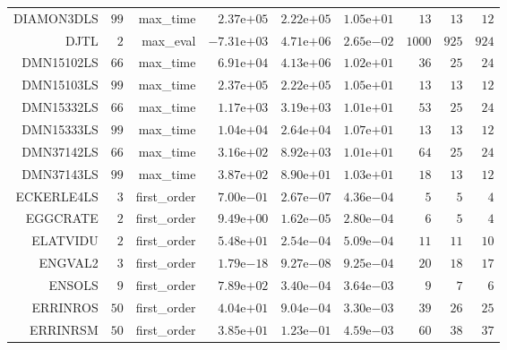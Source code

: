 \begin{longtable}{rrrrrrrrr}
DIAMON3DLS & \(    99\) & max\_time & \( 2.37\)e\(+05\) & \( 2.22\)e\(+05\) & \( 1.05\)e\(+01\) & \(    13\) & \(    13\) & \(    12\) \\
DJTL & \(     2\) & max\_eval & \(-7.31\)e\(+03\) & \( 4.71\)e\(+06\) & \( 2.65\)e\(-02\) & \(  1000\) & \(   925\) & \(   924\) \\
DMN15102LS & \(    66\) & max\_time & \( 6.91\)e\(+04\) & \( 4.13\)e\(+06\) & \( 1.02\)e\(+01\) & \(    36\) & \(    25\) & \(    24\) \\
DMN15103LS & \(    99\) & max\_time & \( 2.37\)e\(+05\) & \( 2.22\)e\(+05\) & \( 1.05\)e\(+01\) & \(    13\) & \(    13\) & \(    12\) \\
DMN15332LS & \(    66\) & max\_time & \( 1.17\)e\(+03\) & \( 3.19\)e\(+03\) & \( 1.01\)e\(+01\) & \(    53\) & \(    25\) & \(    24\) \\
DMN15333LS & \(    99\) & max\_time & \( 1.04\)e\(+04\) & \( 2.64\)e\(+04\) & \( 1.07\)e\(+01\) & \(    13\) & \(    13\) & \(    12\) \\
DMN37142LS & \(    66\) & max\_time & \( 3.16\)e\(+02\) & \( 8.92\)e\(+03\) & \( 1.01\)e\(+01\) & \(    64\) & \(    25\) & \(    24\) \\
DMN37143LS & \(    99\) & max\_time & \( 3.87\)e\(+02\) & \( 8.90\)e\(+01\) & \( 1.03\)e\(+01\) & \(    18\) & \(    13\) & \(    12\) \\
ECKERLE4LS & \(     3\) & first\_order & \( 7.00\)e\(-01\) & \( 2.67\)e\(-07\) & \( 4.36\)e\(-04\) & \(     5\) & \(     5\) & \(     4\) \\
EGGCRATE & \(     2\) & first\_order & \( 9.49\)e\(+00\) & \( 1.62\)e\(-05\) & \( 2.80\)e\(-04\) & \(     6\) & \(     5\) & \(     4\) \\
ELATVIDU & \(     2\) & first\_order & \( 5.48\)e\(+01\) & \( 2.54\)e\(-04\) & \( 5.09\)e\(-04\) & \(    11\) & \(    11\) & \(    10\) \\
ENGVAL2 & \(     3\) & first\_order & \( 1.79\)e\(-18\) & \( 9.27\)e\(-08\) & \( 9.25\)e\(-04\) & \(    20\) & \(    18\) & \(    17\) \\
ENSOLS & \(     9\) & first\_order & \( 7.89\)e\(+02\) & \( 3.40\)e\(-04\) & \( 3.64\)e\(-03\) & \(     9\) & \(     7\) & \(     6\) \\
ERRINROS & \(    50\) & first\_order & \( 4.04\)e\(+01\) & \( 9.04\)e\(-04\) & \( 3.30\)e\(-03\) & \(    39\) & \(    26\) & \(    25\) \\
ERRINRSM & \(    50\) & first\_order & \( 3.85\)e\(+01\) & \( 1.23\)e\(-01\) & \( 4.59\)e\(-03\) & \(    60\) & \(    38\) & \(    37\) \\

\end{longtable}
